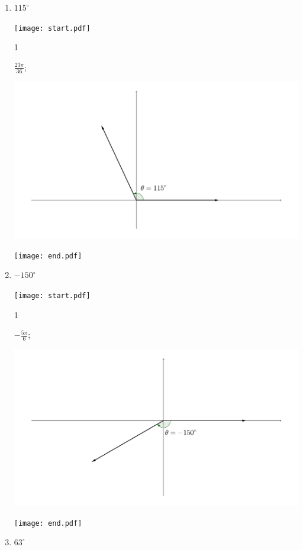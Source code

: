 \documentclass[12pt]{article}
\begin{document}
\begin{enumerate}
\begin{enumerate}

\item $\displaystyle 115^{\circ}$

\texttt{[image: start.pdf]}
{{1\linewidth}{$\displaystyle \frac{23\pi}{36}$; \\
\begin{center}\includegraphics[scale=0.4]{115.pdf}
\end{center}}}
\texttt{[image: end.pdf]}


\item $\displaystyle -150^{\circ}$

\texttt{[image: start.pdf]}
{{1\linewidth}{$\displaystyle -\frac{5\pi}{6}$;
\begin{center}\includegraphics[scale=0.4]{-150.pdf}
\end{center}}}
\texttt{[image: end.pdf]}


\item $\displaystyle 63^{\circ}$


\end{enumerate}
\end{enumerate}
\end{document}
